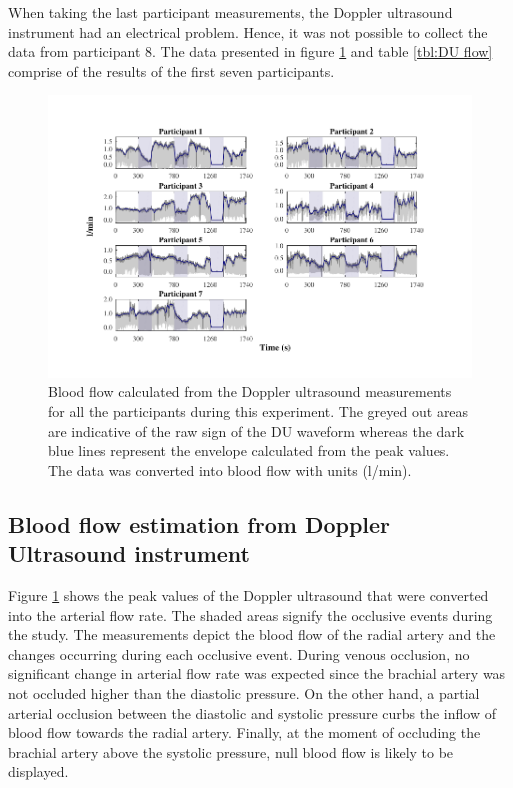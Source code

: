 When taking the last participant measurements, the Doppler ultrasound instrument had an electrical problem. Hence, it was not possible to collect the data from participant 8. The data presented in figure \ref{fig:DU flow} and table \ref{tbl:DU flow} comprise of the results of the first seven participants. 
\begin{figure}[!htb]
	\includegraphics[width=\textwidth,keepaspectratio,trim={1cm 0cm 1.5cm 0cm},clip]{figure_cmp_2}    
	\caption[Blood flow calculated from Doppler Ultrasound device all along the experiment]{Blood flow calculated from the Doppler ultrasound measurements for all the participants during this experiment. The greyed out areas are indicative of the raw sign of the DU waveform whereas the dark blue lines represent the envelope calculated from the peak values. The data was converted into blood flow with units (\si[per-mode=symbol]{\litre\per\minute}).}
	\label{fig:DU flow}
\end{figure}

\subsection{Blood flow estimation from Doppler Ultrasound instrument}
\label{section comparison 2.1}
Figure \ref{fig:DU flow} shows the peak values of the Doppler ultrasound that were converted into the arterial flow rate. The shaded areas signify the occlusive events during the study. The measurements depict the blood flow of the radial artery and the changes occurring during each occlusive event. During venous occlusion, no significant change in arterial flow rate was expected since the brachial artery was not occluded higher than the diastolic pressure. On the other hand, a partial arterial occlusion between the diastolic and systolic pressure curbs the inflow of blood flow towards the radial artery. Finally, at the moment of occluding the brachial artery above the systolic pressure, null blood flow is likely to be displayed.

